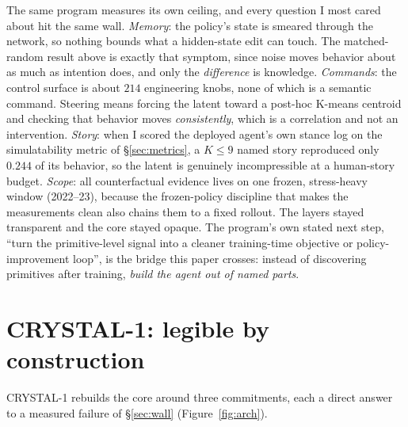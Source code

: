 \documentclass[11pt]{article}
\begin{document}
The same program measures its own ceiling, and every question I most cared about hit the same
wall. \emph{Memory}: the policy's state is smeared through the network, so nothing bounds what a
hidden-state edit can touch. The matched-random result above is exactly that symptom, since noise
moves behavior about as much as intention does, and only the \emph{difference} is knowledge.
\emph{Commands}: the control surface is about $214$ engineering knobs, none of which is a semantic
command. Steering means forcing the latent toward a post-hoc K-means centroid and checking that
behavior moves \emph{consistently}, which is a correlation and not an intervention.
\emph{Story}: when I scored the deployed agent's own stance log on the simulatability metric of
\S\ref{sec:metrics}, a $K{\le}9$ named story reproduced only $0.244$ of its behavior, so the
latent is genuinely incompressible at a human-story budget. \emph{Scope}: all counterfactual
evidence lives on one frozen, stress-heavy window (2022--23), because the frozen-policy discipline
that makes the measurements clean also chains them to a fixed rollout. The layers stayed
transparent and the core stayed opaque. The program's own stated next step, ``turn the
primitive-level signal into a cleaner training-time objective or policy-improvement loop'', is the
bridge this paper crosses: instead of discovering primitives after training, \emph{build the agent
out of named parts}.

\section{CRYSTAL-1: legible by construction}
\label{sec:crystal}

CRYSTAL-1 rebuilds the core around three commitments, each a direct answer to a measured
failure of \S\ref{sec:wall} (Figure~\ref{fig:arch}).
\end{document}
